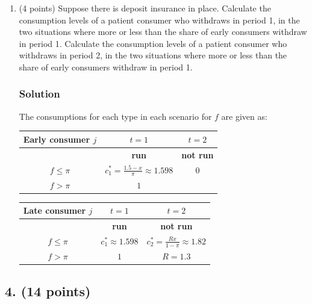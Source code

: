 \documentclass[12pt]{article}
\begin{document}
\begin{enumerate}[label=(\alph*)]
    \item (4 points) Suppose there is deposit insurance in place. Calculate the consumption levels of a patient consumer who withdraws in period 1, in the two situations where more or less than the share of early consumers withdraw in period 1. Calculate the consumption levels of a patient consumer who withdraws in period 2, in the two situations where more or less than the share of early consumers withdraw in period 1.
    \subsubsection*{Solution}

    The consumptions for each type in each scenario for $f$ are given as: 

    
        \begin{tabular}{|c|c|c|}
        \textbf{Early consumer $j$} & $t=1$ & $t=2$  \\
            \hline
            & \textbf{run} & \textbf{not run } \\
            \hline
            \textbf{ $f \leq \pi $} & $c_1^* = \frac{1.5-x}{\pi} \approx 1.598$ & $0$ \\
            \hline
            \textbf{$f > \pi $ } & $1 $ &  \\
            \hline
        \end{tabular}
        \begin{tabular}{|c|c|c|}
        \textbf{Late consumer $j$}& $t=1$ & $t=2$\\
            \hline
            & \textbf{run} & \textbf{not run } \\
            \hline
            \textbf{$f \leq \pi $} & $c_1^* \approx 1.598$ & $c_2^*= \frac{Rx}{1-\pi} \approx 1.82$ \\
            \hline
            \textbf{$f > \pi $} & $1$ & $R=1.3$ \\
            \hline
        \end{tabular}

    
\end{enumerate}

\subsection*{4. (14 points)}
\end{document}
